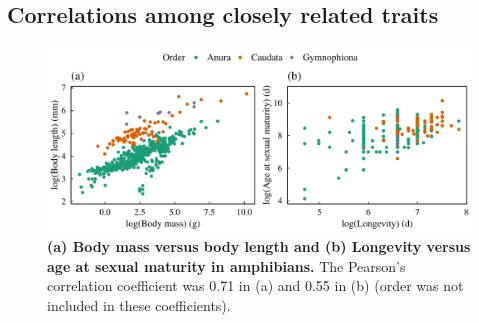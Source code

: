 \subsection*{Correlations among closely related traits}

\begin{figure}[h!]
\centering
\includegraphics[scale=0.85]{Supporting/Chapter2/Figures/Correlations/MatLong_BMBL_amphibians}
\caption[(a) Body mass versus body length and (b) Longevity versus age at sexual maturity in amphibians.]{\textbf{(a) Body mass versus body length and (b) Longevity versus age at sexual maturity in amphibians.} The Pearson's correlation coefficient was 0.71 in (a) and 0.55 in (b) (order was not included in these coefficients).} 
\label{}
\end{figure}

